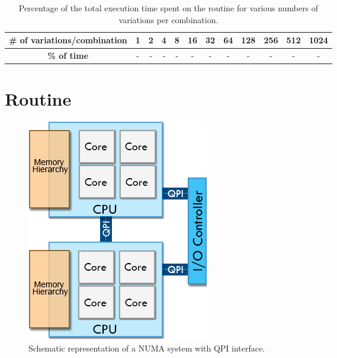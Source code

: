 \begin{table}[!htp]
	\begin{center}
		\begin{tabular}{|c|c|c|c|c|c|c|c|c|c|c|c|}
			\hline
			\textbf{# of variations/combination} & 1 & 2 & 4 & 8 & 16 & 32 & 64 & 128 & 256 & 512 & 1024 \\ \hline
			\textbf{\% of time} & - & - & - & - & - & - & - & - & - & - & - \\ \hline
		\end{tabular}
		\caption{Percentage of the total execution time spent on the \ttDilepKinFit routine for various numbers of variations per combination.}
		\label{tab:TempoKinFit}
	\end{center}
\end{table}


\section{\ttDilepKinFit Routine}
\label{Application:ttDilepKinFit}



\begin{figure}[!htp]
	\begin{center}
		\includegraphics[scale=0.5]{../../common/img/numa_qpi.png}
		\caption{Schematic representation of a NUMA system with QPI interface.}
		\label{fig:CallgraphOriginal}
	\end{center}
\end{figure}